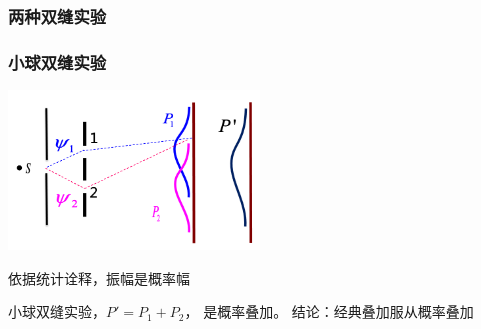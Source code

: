  \begin{frame}
     \frametitle{两种双缝实验}
         \begin{figure}
             \centering
         \end{figure}
     \setcounter{subfigure}{0}
 \end{frame}
 
 \begin{frame}
     \frametitle{小球双缝实验}
     \begin{center}
         \includegraphics[width=0.5\textwidth]{figs/sup-2.png} \\
     \end{center} 
     依据统计诠释，振幅是概率幅\\
     \begin{itemize}
         \Item 小球双缝实验，$P'=P_1+P_2 $， 是概率叠加。
         \Item 结论：经典叠加服从概率叠加
     \end{itemize}
 \end{frame} 
 
